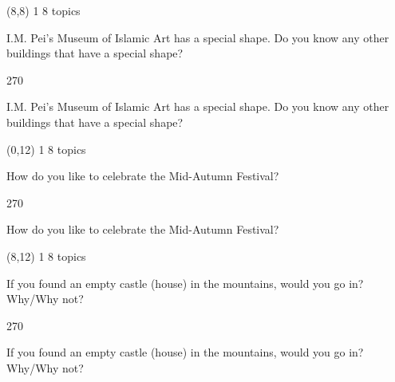 \documentclass[a4paper]{article}
\newenvironment{itemize*}%
{\begin{itemize}%
 \setlength{\itemsep}{0.5cm}%
 \setlength{\parsep}{0pt}%
 \setlength{\parskip}{0pt}}%
{\end{itemize}}
\newcommand{\mycard}[3]{%
	\small #1 #2
	\par
	\parbox[t][6.8cm][c]{9.5cm}{%
	\par
	\myleft{#3}
	\par
	\myright{#3}
	}
}
\newcommand{\myleft}[1]{%
	\begin{sideways}
	\hspace*{-0.9cm}
		\parbox[t][2.7cm][t]{6.5cm}{%
		\large #1
		}
	\end{sideways}
}
\newcommand{\myright}[1]{%
	\hspace*{6.5cm}
	\begin{turn}{270}
	\hspace*{-7.1cm}
		\parbox[t][2.7cm][t]{6.5cm}{%
		\large #1
		}
	\end{turn}
}
\begin{document}
\begin{textblock}{8}(8,8)
\mycard{1}{8 topics}{
\begin{itemize*}
\item I.M. Pei's Museum of Islamic Art has a special shape. Do you know any other buildings that have a special shape?
\end{itemize*}
}
\end{textblock}

\begin{textblock}{8}(0,12)
\mycard{1}{8 topics}{
\begin{itemize*}
\item How do you like to celebrate the Mid-Autumn Festival?
\end{itemize*}
}
\end{textblock}

\begin{textblock}{8}(8,12)
\mycard{1}{8 topics}{
\begin{itemize*}
\item If you found an empty castle (house) in the mountains, would you go in? Why/Why not?
\end{itemize*}
}
\end{textblock}

\null
\newpage
\end{document}
